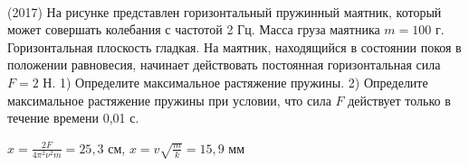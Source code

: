 \begin{ex}
\hspace{0pt} \\
(2017) На рисунке представлен горизонтальный пружинный маятник, который может совершать колебания с частотой 2 Гц. Масса груза маятника $m = 100$ г. Горизонтальная плоскость гладкая. На маятник, находящийся в состоянии покоя в положении равновесия, начинает действовать постоянная горизонтальная сила $F = 2$ Н. 1) Определите максимальное растяжение пружины. 2) Определите максимальное растяжение пружины при условии, что сила $F$ действует только в течение времени 0,01 с.
\begin{center}

\end{center}
\begin{ans}
$x = \frac{2F}{4\pi^2 \nu^2 m} = 25,3$ см, $x = v\sqrt{\frac{m}{k}}=15,9$ мм
\end{ans}
\end{ex}